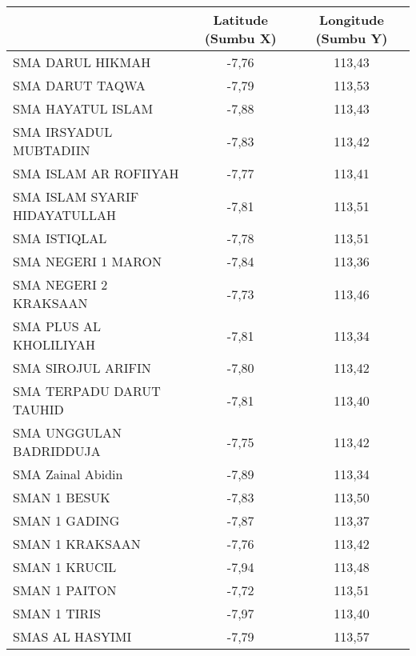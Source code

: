 {\scriptsize
\begin{longtable}[c]{lcc}
\rowcolor[HTML]{4472C4} 
\multicolumn{1}{c}{\cellcolor[HTML]{4472C4}{\color[HTML]{FFFFFF} \textbf{Nama   Sekolah}}} &
  {\color[HTML]{FFFFFF} \textbf{Latitude (Sumbu X)}} &
  {\color[HTML]{FFFFFF} \textbf{Longitude (Sumbu Y)}} \\
\endfirsthead
%
\endhead
%
\rowcolor[HTML]{D9E1F2} 
SMA DARUL HIKMAH                    & -7,76 & 113,43 \\
SMA   DARUT TAQWA                   & -7,79 & 113,53 \\
\rowcolor[HTML]{D9E1F2} 
SMA HAYATUL ISLAM                   & -7,88 & 113,43 \\
SMA   IRSYADUL MUBTADIIN            & -7,83 & 113,42 \\
\rowcolor[HTML]{D9E1F2} 
SMA ISLAM AR ROFIIYAH               & -7,77 & 113,41 \\
SMA   ISLAM SYARIF HIDAYATULLAH     & -7,81 & 113,51 \\
\rowcolor[HTML]{D9E1F2} 
SMA ISTIQLAL                        & -7,78 & 113,51 \\
SMA   NEGERI 1 MARON                & -7,84 & 113,36 \\
\rowcolor[HTML]{D9E1F2} 
SMA NEGERI 2 KRAKSAAN               & -7,73 & 113,46 \\
SMA   PLUS AL KHOLILIYAH            & -7,81 & 113,34 \\
\rowcolor[HTML]{D9E1F2} 
SMA SIROJUL ARIFIN                  & -7,80 & 113,42 \\
SMA   TERPADU DARUT TAUHID          & -7,81 & 113,40 \\
\rowcolor[HTML]{D9E1F2} 
SMA UNGGULAN BADRIDDUJA             & -7,75 & 113,42 \\
SMA   Zainal Abidin                 & -7,89 & 113,34 \\
\rowcolor[HTML]{D9E1F2} 
SMAN 1 BESUK                        & -7,83 & 113,50 \\
SMAN   1 GADING                     & -7,87 & 113,37 \\
\rowcolor[HTML]{D9E1F2} 
SMAN 1 KRAKSAAN                     & -7,76 & 113,42 \\
SMAN   1 KRUCIL                     & -7,94 & 113,48 \\
\rowcolor[HTML]{D9E1F2} 
SMAN 1 PAITON                       & -7,72 & 113,51 \\
SMAN   1 TIRIS                      & -7,97 & 113,40 \\
\rowcolor[HTML]{D9E1F2} 
SMAS AL HASYIMI                     & -7,79 & 113,57 \\

\end{longtable}}
